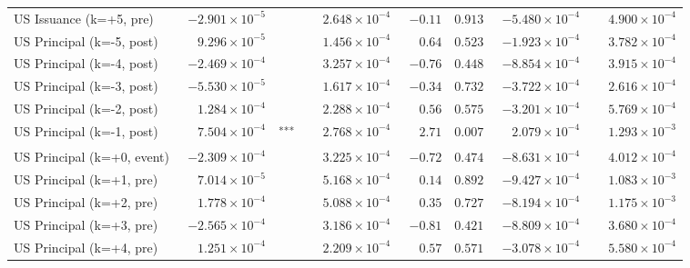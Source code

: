 \documentclass[10pt]{article}
\begin{document}
\begin{tabular}{@{}l|r@{}l rrr rr@{}}
US Issuance (k=+5, pre) & $-2.901\!\times\!10^{-5}$ & \textsuperscript{} & $\phantom{-}2.648\!\times\!10^{-4}$ & $-0.11$ & $0.913$ & $-5.480\!\times\!10^{-4}$ & $\phantom{-}4.900\!\times\!10^{-4}$ \\
\addlinespace[0.3em]
US Principal (k=-5, post) & $\phantom{-}9.296\!\times\!10^{-5}$ & \textsuperscript{} & $\phantom{-}1.456\!\times\!10^{-4}$ & $\phantom{-}0.64$ & $0.523$ & $-1.923\!\times\!10^{-4}$ & $\phantom{-}3.782\!\times\!10^{-4}$ \\
US Principal (k=-4, post) & $-2.469\!\times\!10^{-4}$ & \textsuperscript{} & $\phantom{-}3.257\!\times\!10^{-4}$ & $-0.76$ & $0.448$ & $-8.854\!\times\!10^{-4}$ & $\phantom{-}3.915\!\times\!10^{-4}$ \\
US Principal (k=-3, post) & $-5.530\!\times\!10^{-5}$ & \textsuperscript{} & $\phantom{-}1.617\!\times\!10^{-4}$ & $-0.34$ & $0.732$ & $-3.722\!\times\!10^{-4}$ & $\phantom{-}2.616\!\times\!10^{-4}$ \\
US Principal (k=-2, post) & $\phantom{-}1.284\!\times\!10^{-4}$ & \textsuperscript{} & $\phantom{-}2.288\!\times\!10^{-4}$ & $\phantom{-}0.56$ & $0.575$ & $-3.201\!\times\!10^{-4}$ & $\phantom{-}5.769\!\times\!10^{-4}$ \\
US Principal (k=-1, post) & $\phantom{-}7.504\!\times\!10^{-4}$ & \textsuperscript{***} & $\phantom{-}2.768\!\times\!10^{-4}$ & $\phantom{-}2.71$ & $0.007$ & $\phantom{-}2.079\!\times\!10^{-4}$ & $\phantom{-}1.293\!\times\!10^{-3}$ \\
US Principal (k=+0, event) & $-2.309\!\times\!10^{-4}$ & \textsuperscript{} & $\phantom{-}3.225\!\times\!10^{-4}$ & $-0.72$ & $0.474$ & $-8.631\!\times\!10^{-4}$ & $\phantom{-}4.012\!\times\!10^{-4}$ \\
US Principal (k=+1, pre) & $\phantom{-}7.014\!\times\!10^{-5}$ & \textsuperscript{} & $\phantom{-}5.168\!\times\!10^{-4}$ & $\phantom{-}0.14$ & $0.892$ & $-9.427\!\times\!10^{-4}$ & $\phantom{-}1.083\!\times\!10^{-3}$ \\
US Principal (k=+2, pre) & $\phantom{-}1.778\!\times\!10^{-4}$ & \textsuperscript{} & $\phantom{-}5.088\!\times\!10^{-4}$ & $\phantom{-}0.35$ & $0.727$ & $-8.194\!\times\!10^{-4}$ & $\phantom{-}1.175\!\times\!10^{-3}$ \\
US Principal (k=+3, pre) & $-2.565\!\times\!10^{-4}$ & \textsuperscript{} & $\phantom{-}3.186\!\times\!10^{-4}$ & $-0.81$ & $0.421$ & $-8.809\!\times\!10^{-4}$ & $\phantom{-}3.680\!\times\!10^{-4}$ \\
US Principal (k=+4, pre) & $\phantom{-}1.251\!\times\!10^{-4}$ & \textsuperscript{} & $\phantom{-}2.209\!\times\!10^{-4}$ & $\phantom{-}0.57$ & $0.571$ & $-3.078\!\times\!10^{-4}$ & $\phantom{-}5.580\!\times\!10^{-4}$ \\

\end{tabular}
\end{document}
